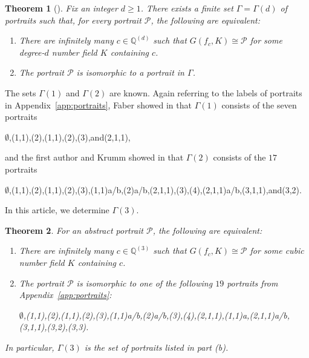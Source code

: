 \documentclass[12pt]{amsart}
\newtheorem{thm}{Theorem}[section]
\theoremstyle{definition}
\newcommand{\bbQ}{\mathbb{Q}}
\newcommand{\calP}{\mathcal{P}}
\numberwithin{equation}{section}
\begin{document}
\begin{thm}[{\cite[Theorem 1.11]{doyle/krumm:2024}}]
Fix an integer $d \ge 1$. There exists a finite set $\Gamma = \Gamma(d)$ of portraits such that, for every portrait $\calP$, the following are equivalent:
    \begin{enumerate}[label=\rm(\alph*)]
        \item There are infinitely many $c \in \bbQ^{(d)}$ such that $G(f_c, K) \cong \calP$ for some degree-$d$ number field $K$ containing $c$.
        \item The portrait $\calP$ is isomorphic to a portrait in $\Gamma$.
    \end{enumerate}
\end{thm}

The sets $\Gamma(1)$ and $\Gamma(2)$ are known. Again referring to the labels of portraits in Appendix~\ref{app:portraits}, Faber showed in \cite{faber:2015} that $\Gamma(1)$ consists of the seven portraits
    \begin{center}
    $\emptyset$,(1,1),(2),(1,1),(2),(3),\quad and(2,1,1),
    \end{center}
and the first author and Krumm showed in \cite{doyle/krumm:2024} that $\Gamma(2)$ consists of the $17$ portraits
    \begin{center}
    $\emptyset$,(1,1),(2),(1,1),(2),(3),(1,1)a/b,(2)a/b,(2,1,1),(3),(4),(2,1,1)a/b,(3,1,1),\quad and(3,2).
    \end{center}
In this article, we determine $\Gamma(3)$.

\begin{thm}\label{thm:main_dynamical}
    For an abstract portrait $\calP$, the following are equivalent:
        \begin{enumerate}[label=\rm(\alph*)]
            \item There are infinitely many $c \in \bbQ^{(3)}$ such that $G(f_c, K) \cong \calP$ for some cubic number field $K$ containing $c$.
            \item The portrait $\calP$ is isomorphic to one of the following $19$ portraits from Appendix~\ref{app:portraits}:
            \begin{center}
            \rm
            $\emptyset$,(1,1),(2),(1,1),(2),(3),(1,1)a/b,(2)a/b,(3),(4),(2,1,1),(1,1)a,(2,1,1)a/b,(3,1,1),(3,2),(3,3).
            \end{center}
        \end{enumerate}
    In particular, $\Gamma(3)$ is the set of portraits listed in part \emph{(b)}.
\end{thm}
\end{document}
